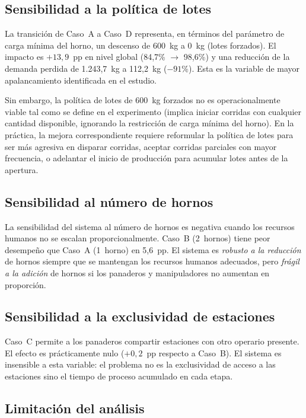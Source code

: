 \documentclass[12pt]{article}
\begin{document}
\subsection{Sensibilidad a la política de lotes}

La transición de Caso~A a Caso~D representa, en términos del parámetro de carga mínima del horno, un descenso de 600~kg a 0~kg (lotes forzados). El impacto es $+13,9$~pp en nivel global (84,7\% $\to$ 98,6\%) y una reducción de la demanda perdida de 1.243,7~kg a 112,2~kg ($-91\%$). Esta es la variable de mayor apalancamiento identificada en el estudio.

Sin embargo, la política de lotes de 600~kg forzados no es operacionalmente viable tal como se define en el experimento (implica iniciar corridas con cualquier cantidad disponible, ignorando la restricción de carga mínima del horno). En la práctica, la mejora correspondiente requiere reformular la política de lotes para ser más agresiva en disparar corridas, aceptar corridas parciales con mayor frecuencia, o adelantar el inicio de producción para acumular lotes antes de la apertura.

\subsection{Sensibilidad al número de hornos}

La sensibilidad del sistema al número de hornos es negativa cuando los recursos humanos no se escalan proporcionalmente. Caso~B (2~hornos) tiene peor desempeño que Caso~A (1~horno) en 5,6~pp. El sistema es \emph{robusto a la reducción} de hornos siempre que se mantengan los recursos humanos adecuados, pero \emph{frágil a la adición} de hornos si los panaderos y manipuladores no aumentan en proporción.

\subsection{Sensibilidad a la exclusividad de estaciones}

Caso~C permite a los panaderos compartir estaciones con otro operario presente. El efecto es prácticamente nulo ($+0,2$~pp respecto a Caso~B). El sistema es insensible a esta variable: el problema no es la exclusividad de acceso a las estaciones sino el tiempo de proceso acumulado en cada etapa.

\subsection{Limitación del análisis}
\end{document}
